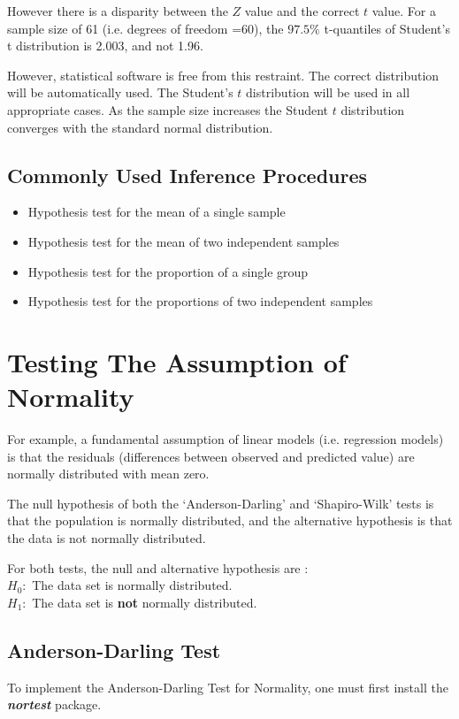 \documentclass[a4paper,12pt]{article}
\begin{document}
However there is a disparity between the $Z$ value and the correct $t$ value. For a sample size of 61 (i.e. degrees of freedom =60), the $97.5\%$ t-quantiles of Student's t distribution is 2.003, and not 1.96.

However, statistical software is free from this restraint. The correct distribution will be automatically used. The Student's $t$ distribution will be used in all appropriate cases. As the sample size increases the Student $t$ distribution converges with the standard normal distribution.

\subsection{Commonly Used Inference Procedures}
\begin{itemize}
\item	   Hypothesis test for the mean of a single sample
\item	   Hypothesis test for the mean of two independent samples
\item	   Hypothesis test for the proportion of a single group
\item	   Hypothesis test for the proportions of two independent samples
\end{itemize}

\section{Testing The Assumption of Normality}
For example, a fundamental assumption of linear models (i.e. regression models) is that the residuals (differences between observed and predicted value) are normally distributed with mean zero.


The null hypothesis of both the `Anderson-Darling' and `Shapiro-Wilk' tests is that the population is normally distributed, and the alternative hypothesis is that the data is not normally distributed.

For both tests, the null and alternative hypothesis are :\\
\qquad $H_0 : $ The data set is normally distributed.\\
\qquad $H_1 : $ The data set is \textbf{not} normally distributed.\\

\subsection{Anderson-Darling Test}
To implement the Anderson-Darling Test for Normality, one must first install the \textbf{\emph{nortest}} package.
\end{document}
